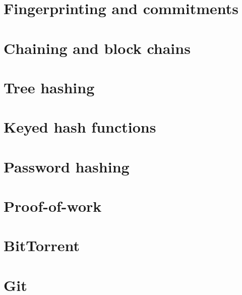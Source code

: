\section[Commitments]{Fingerprinting and commitments}


\section[Chaining]{Chaining and block chains}


\section{Tree hashing}


\section{Keyed hash functions}


\section{Password hashing}


\section{Proof-of-work}


\section{BitTorrent}


\section{Git}

